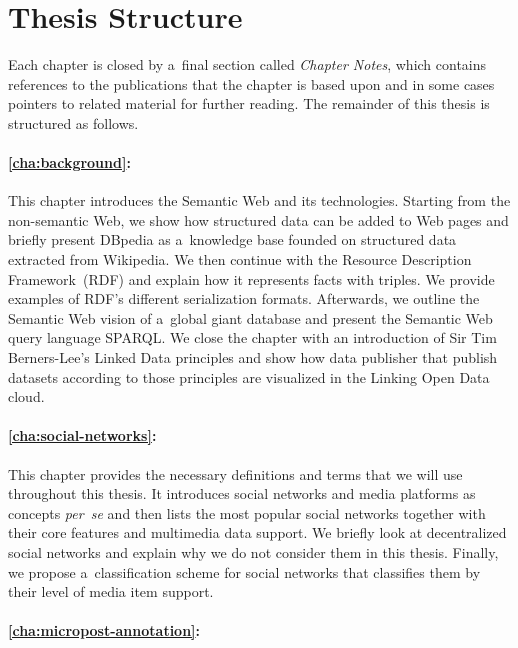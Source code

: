 \section{Thesis Structure}

Each chapter is closed by a~final section called
\emph{Chapter Notes}, which contains references to the publications
that the chapter is based upon
and in some cases pointers to related material for further reading.
The remainder of this thesis is structured as follows. 

\paragraph{\autoref{cha:background}:}

This chapter introduces the Semantic Web and its technologies.
Starting from the non-semantic Web,
we show how structured data can be added to Web pages
and briefly present DBpedia as a~knowledge base
founded on structured data extracted from Wikipedia.
We then continue with the Resource Description Framework~(RDF)
and explain how it represents facts with triples.
We provide examples of RDF's different serialization formats.
Afterwards, we outline the Semantic Web vision of
a~global giant database and present the Semantic Web
query language SPARQL.
We close the chapter with an introduction of Sir Tim Berners-Lee's
Linked Data principles and show how data publisher that publish
datasets according to those principles are visualized in the
Linking Open Data cloud.

\paragraph{\autoref{cha:social-networks}:}

This chapter provides the necessary definitions and terms
that we will use throughout this thesis. 
It introduces social networks and media platforms as concepts
\emph{per~se} and then lists the most popular social networks
together with their core features and multimedia data support.
We briefly look at decentralized social networks and explain
why we do not consider them in this thesis.
Finally, we propose a~classification scheme for social networks
that classifies them by their level of media item support.

\paragraph{\autoref{cha:micropost-annotation}:}


